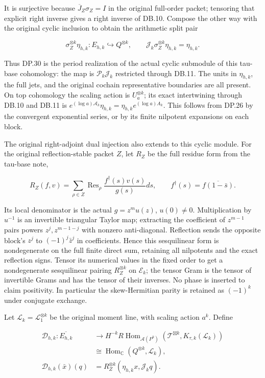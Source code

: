 It is surjective because \(\overline J_Z\sigma_Z=I\) in the original full-order packet; tensoring that explicit right inverse gives a right inverse of DB.10. Compose the other way with the original cyclic inclusion to obtain the arithmetic split pair

\[
\sigma_Z^{\otimes k}\eta_{h,k}:E_{h,k}\hookrightarrow Q^{\otimes k},
\qquad
\mathcal J_k\sigma_Z^{\otimes k}\eta_{h,k}=\eta_{h,k}.
\tag{DB.11}
\]

Thus DP.30 is the period realization of the actual cyclic submodule of this tau-base cohomology: the map is \(\mathscr P_k\mathcal J_k\) restricted through DB.11. The units in \(\eta_{h,k}\), the full jets, and the original cochain representative boundaries are all present. On top cohomology the scaling action is \(U_a^{\otimes k}\); its exact intertwining through DB.10 and DB.11 is \(e^{(\log a)\mathcal A_k}\eta_{h,k}=\eta_{h,k}e^{(\log a)A_k}\). This follows from DP.26 by the convergent exponential series, or by its finite nilpotent expansions on each block.

The original right-adjoint dual injection also extends to this cyclic module. For the original reflection-stable packet \(Z\), let \(R_Z\) be the full residue form from the tau-base note,

\[
R_Z(f,v)=\sum_{\rho\in Z}\operatorname{Res}_{\rho}
 \frac{f^\dagger(s)v(s)}{g(s)}ds,
\qquad f^\dagger(s)=\overline{f(1-\bar s)}.
\tag{DB.12}
\]

Its local denominator is the actual \(g=z^m u(z)\), \(u(0)\ne0\). Multiplication by \(u^{-1}\) is an invertible triangular Taylor map; extracting the coefficient of \(z^{m-1}\) pairs powers \(z^j,z^{m-1-j}\) with nonzero anti-diagonal. Reflection sends the opposite block's \(z^j\) to \((-1)^j\bar z^j\) in coefficients. Hence this sesquilinear form is nondegenerate on the full finite direct sum, retaining all nilpotents and the exact reflection signs. Tensor its numerical values in the fixed order to get a nondegenerate sesquilinear pairing \(R_Z^{\otimes k}\) on \(\mathcal E_k\); the tensor Gram is the tensor of invertible Grams and has the tensor of their inverses. No phase is inserted to claim positivity. In particular the skew-Hermitian parity is retained as \((-1)^k\) under conjugate exchange.

Let \(\mathcal L_k=\mathcal L_1^{\otimes k}\) be the original moment line, with scaling action \(a^k\). Define

\[
\begin{aligned}
\mathcal D_{h,k}:\overline{E_{h,k}}&\longrightarrow
H^{-k}R\operatorname{Hom}_{\mathcal A(P^k)}
 (\mathcal T^{\boxtimes k},K_{\tau,k}(\mathcal L_k))\\
&\cong\operatorname{Hom}_{\mathbb C}(Q^{\otimes k},\mathcal L_k),\\
\mathcal D_{h,k}(\bar x)(q)&=
R_Z^{\otimes k}(\eta_{h,k}x,\mathcal J_k q).
\end{aligned}
\tag{DB.13}
\]


